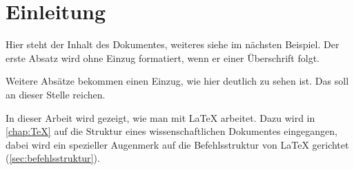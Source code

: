 

\mainmatter                     %

\chapter{Einleitung}   %

Hier steht der Inhalt des Dokumentes, weiteres siehe im n\"achsten
Beispiel. Der erste Absatz wird ohne Einzug formatiert, wenn er einer \"Uberschrift folgt.

Weitere Absätze bekommen einen Einzug, wie hier deutlich zu sehen ist.
Das soll an dieser Stelle reichen.

In dieser Arbeit wird gezeigt, wie man mit \LaTeX{} arbeitet. Dazu
wird in \cref{chap:TeX} auf die Struktur eines wissenschaftlichen
Dokumentes eingegangen, dabei wird ein spezieller Augenmerk auf die
Befehlsstruktur von \LaTeX{} gerichtet (\cref{sec:befehlsstruktur}).


